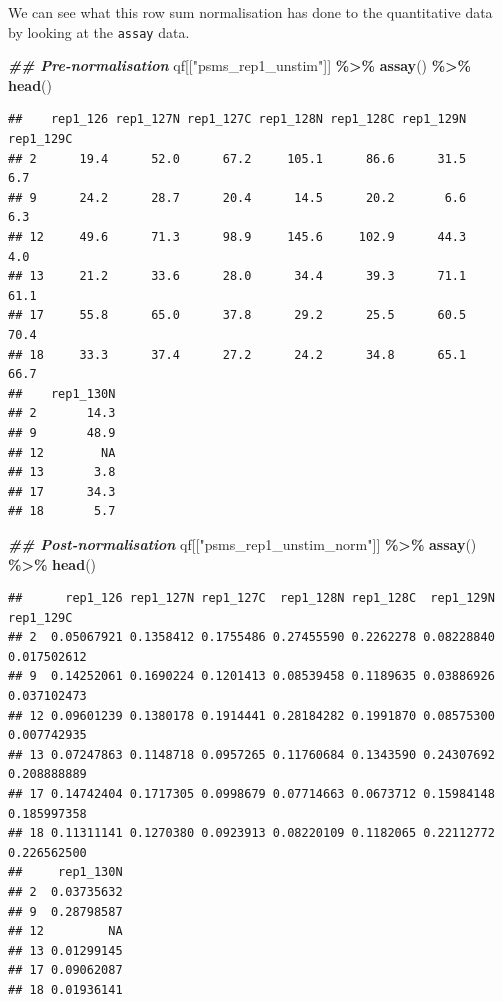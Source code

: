 \documentclass[9pt,a4paper,]{extarticle}
\newenvironment{Shaded}{\begin{snugshade}}{\end{snugshade}}
\newcommand{\DocumentationTok}[1]{\textcolor[rgb]{0.56,0.35,0.01}{\textbf{\textit{#1}}}}
\newcommand{\FunctionTok}[1]{\textcolor[rgb]{0.13,0.29,0.53}{\textbf{#1}}}
\newcommand{\NormalTok}[1]{#1}
\newcommand{\SpecialCharTok}[1]{\textcolor[rgb]{0.81,0.36,0.00}{\textbf{#1}}}
\newcommand{\StringTok}[1]{\textcolor[rgb]{0.31,0.60,0.02}{#1}}
\begin{document}
We can see what this row sum normalisation has done to the quantitative data by
looking at the \texttt{assay} data.

\begin{Shaded}
\begin{Highlighting}[]
\DocumentationTok{\#\# Pre{-}normalisation}
\NormalTok{qf[[}\StringTok{"psms\_rep1\_unstim"}\NormalTok{]] }\SpecialCharTok{\%\textgreater{}\%}
  \FunctionTok{assay}\NormalTok{() }\SpecialCharTok{\%\textgreater{}\%}
  \FunctionTok{head}\NormalTok{()}
\end{Highlighting}
\end{Shaded}

\begin{verbatim}
##    rep1_126 rep1_127N rep1_127C rep1_128N rep1_128C rep1_129N rep1_129C
## 2      19.4      52.0      67.2     105.1      86.6      31.5       6.7
## 9      24.2      28.7      20.4      14.5      20.2       6.6       6.3
## 12     49.6      71.3      98.9     145.6     102.9      44.3       4.0
## 13     21.2      33.6      28.0      34.4      39.3      71.1      61.1
## 17     55.8      65.0      37.8      29.2      25.5      60.5      70.4
## 18     33.3      37.4      27.2      24.2      34.8      65.1      66.7
##    rep1_130N
## 2       14.3
## 9       48.9
## 12        NA
## 13       3.8
## 17      34.3
## 18       5.7
\end{verbatim}

\begin{Shaded}
\begin{Highlighting}[]
\DocumentationTok{\#\# Post{-}normalisation}
\NormalTok{qf[[}\StringTok{"psms\_rep1\_unstim\_norm"}\NormalTok{]] }\SpecialCharTok{\%\textgreater{}\%}
  \FunctionTok{assay}\NormalTok{() }\SpecialCharTok{\%\textgreater{}\%}
  \FunctionTok{head}\NormalTok{()}
\end{Highlighting}
\end{Shaded}

\begin{verbatim}
##      rep1_126 rep1_127N rep1_127C  rep1_128N rep1_128C  rep1_129N   rep1_129C
## 2  0.05067921 0.1358412 0.1755486 0.27455590 0.2262278 0.08228840 0.017502612
## 9  0.14252061 0.1690224 0.1201413 0.08539458 0.1189635 0.03886926 0.037102473
## 12 0.09601239 0.1380178 0.1914441 0.28184282 0.1991870 0.08575300 0.007742935
## 13 0.07247863 0.1148718 0.0957265 0.11760684 0.1343590 0.24307692 0.208888889
## 17 0.14742404 0.1717305 0.0998679 0.07714663 0.0673712 0.15984148 0.185997358
## 18 0.11311141 0.1270380 0.0923913 0.08220109 0.1182065 0.22112772 0.226562500
##     rep1_130N
## 2  0.03735632
## 9  0.28798587
## 12         NA
## 13 0.01299145
## 17 0.09062087
## 18 0.01936141
\end{verbatim}
\end{document}
